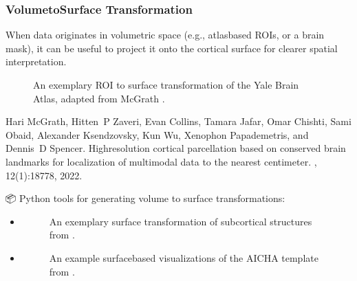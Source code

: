 \documentclass[letterpaper,10pt,english]{jupyterBook}
\begin{document}
\subsubsection{Volume\sphinxhyphen{}to\sphinxhyphen{}Surface Transformation}
\label{\detokenize{chapters/03/03b_visualization-tools:volume-to-surface-transformation}}
\sphinxAtStartPar
When data originates in volumetric space (e.g., atlas\sphinxhyphen{}based ROIs, or a brain mask), it can be useful to project it onto the cortical surface for clearer spatial interpretation.

\begin{figure}[htbp]
\centering
\capstart

\noindent{}
\caption{An exemplary ROI to surface transformation of the Yale Brain Atlas, adapted from McGrath \sphinxfootnotemark[4].}\label{\detokenize{chapters/03/03b_visualization-tools:yba}}\end{figure}
%
\begin{footnotetext}[4]\sphinxAtStartFootnote
Hari McGrath, Hitten P Zaveri, Evan Collins, Tamara Jafar, Omar Chishti, Sami Obaid, Alexander Ksendzovsky, Kun Wu, Xenophon Papademetris, and Dennis D Spencer. High\sphinxhyphen{}resolution cortical parcellation based on conserved brain landmarks for localization of multimodal data to the nearest centimeter. , 12(1):18778, 2022.
%
\end{footnotetext}\ignorespaces 
\sphinxAtStartPar
📦 Python tools for generating volume to surface transformations:
\begin{itemize}
\item {} 
\sphinxAtStartPar
{}

\begin{figure}[htbp]
\centering
\capstart

\noindent{}
\caption{An exemplary surface transformation of subcortical structures from .}\label{\detokenize{chapters/03/03b_visualization-tools:cerebro-volsurf}}\end{figure}

\item {} 
\sphinxAtStartPar
{}

\begin{figure}[htbp]
\centering
\capstart

\noindent{}
\caption{An example surface\sphinxhyphen{}based visualizations of the AICHA template from .}\label{\detokenize{chapters/03/03b_visualization-tools:surfice-volsurf}}\end{figure}

\end{itemize}
\end{document}

